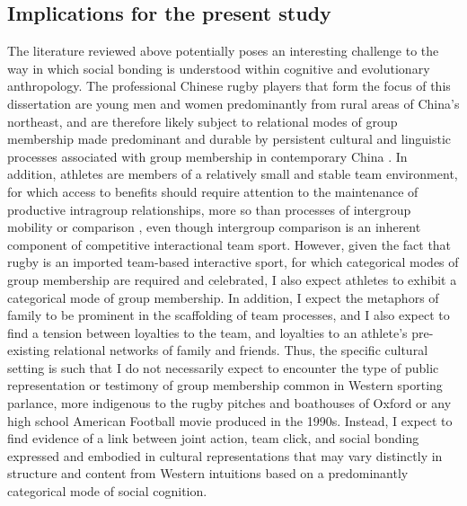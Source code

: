 \subsection{Implications for the present study}
The literature reviewed above potentially poses an interesting challenge to the way in which social bonding is understood within cognitive and evolutionary anthropology.  The professional Chinese rugby players that form the focus of this dissertation are young men and women predominantly from rural areas of China's northeast, and are therefore likely subject to relational modes of group membership made predominant and durable by persistent cultural and linguistic processes associated with group membership in contemporary China \citep{Liu2009}.  In addition, athletes are members of a relatively small and stable team environment, for which access to benefits should require attention to the maintenance of productive intragroup relationships, more so than processes of intergroup mobility or comparison \citep{Schug2010}, even though intergroup comparison is an inherent component of competitive interactional team sport. However, given the fact that rugby is an imported team-based interactive sport, for which categorical modes of group membership are required and celebrated, I also expect athletes to exhibit a categorical mode of group membership.
In addition, I expect the metaphors of family to be prominent in the scaffolding of team processes, and I also expect to find a tension between loyalties to the team, and loyalties to an athlete's pre-existing relational networks of family and friends\citep{Yang1994}.  Thus, the specific cultural setting is such that I do not necessarily expect to encounter the type of public representation or testimony of group membership common in Western sporting parlance, more indigenous to the rugby pitches and boathouses of Oxford or any high school American Football movie produced in the 1990s.  Instead, I expect to find evidence of a link between joint action, team click, and social bonding expressed and embodied in cultural representations that may vary distinctly in structure and content from Western intuitions based on a predominantly categorical mode of social cognition.
